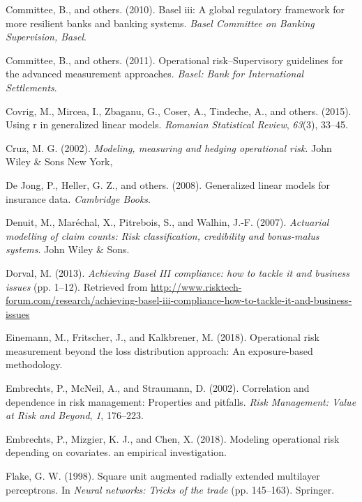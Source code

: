 \documentclass[]{DissertateUSU}
\begin{document}
\hypertarget{ref-basel2010basel}{}
Committee, B., and others. (2010). Basel iii: A global regulatory
framework for more resilient banks and banking systems. \emph{Basel
Committee on Banking Supervision, Basel}.

\hypertarget{ref-basel2011operational}{}
Committee, B., and others. (2011). Operational risk--Supervisory
guidelines for the advanced measurement approaches. \emph{Basel: Bank
for International Settlements}.

\hypertarget{ref-covrig2015using}{}
Covrig, M., Mircea, I., Zbaganu, G., Coser, A., Tindeche, A., and
others. (2015). Using r in generalized linear models. \emph{Romanian
Statistical Review}, \emph{63}(3), 33--45.

\hypertarget{ref-cruz2002modeling}{}
Cruz, M. G. (2002). \emph{Modeling, measuring and hedging operational
risk}. John Wiley \& Sons New York,

\hypertarget{ref-de2008generalized}{}
De Jong, P., Heller, G. Z., and others. (2008). Generalized linear
models for insurance data. \emph{Cambridge Books}.

\hypertarget{ref-denuit2007actuarial}{}
Denuit, M., Maréchal, X., Pitrebois, S., and Walhin, J.-F. (2007).
\emph{Actuarial modelling of claim counts: Risk classification,
credibility and bonus-malus systems}. John Wiley \& Sons.

\hypertarget{ref-mysis2013}{}
Dorval, M. (2013). \emph{Achieving Basel III compliance: how to tackle
it and business issues} (pp. 1--12). Retrieved from
\url{http://www.risktech-forum.com/research/achieving-basel-iii-compliance-how-to-tackle-it-and-business-issues}

\hypertarget{ref-einemann2018operational}{}
Einemann, M., Fritscher, J., and Kalkbrener, M. (2018). Operational risk
measurement beyond the loss distribution approach: An exposure-based
methodology.

\hypertarget{ref-embrechts2002correlation}{}
Embrechts, P., McNeil, A., and Straumann, D. (2002). Correlation and
dependence in risk management: Properties and pitfalls. \emph{Risk
Management: Value at Risk and Beyond}, \emph{1}, 176--223.

\hypertarget{ref-embrechts2018modeling}{}
Embrechts, P., Mizgier, K. J., and Chen, X. (2018). Modeling operational
risk depending on covariates. an empirical investigation.

\hypertarget{ref-flake1998square}{}
Flake, G. W. (1998). Square unit augmented radially extended multilayer
perceptrons. In \emph{Neural networks: Tricks of the trade} (pp.
145--163). Springer.
\end{document}
